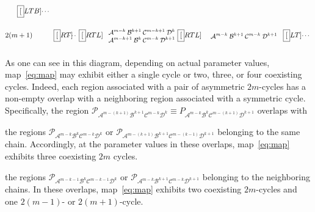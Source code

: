 \documentclass[10pt]{article}
\renewcommand{\P}{{\mathcal P}}
\newcommand{\A}{{\mathcal A}}
\newcommand{\B}{{\mathcal B}}
\newcommand{\C}{{\mathcal C}}
\newcommand{\D}{{\mathcal D}}
\begin{document}
\begin{equation*}
\begin{split}
{		}
		\hspace*{-1ex}
		\fbox[LTB]{
			\begin{minipage}[c][4.5em][c]{4ex}\small
				\dots
			\end{minipage}
		}\\[-1.5em]
		2(m+1)\hspace*{3em}
		&
		\fbox[RT]{
			\begin{minipage}[c][4.5em][c]{3ex}\small
				\hspace*{-.7em}\dots
			\end{minipage}
		}\hspace*{-1ex}
		\fbox[RTL]{
			\begin{minipage}[c][3.5em][c]{11em}\small\centering
				$\A^{m-k}\:\B^{k+1}\:\C^{m-k+1}    \:\D^{k}$\\
				$\A^{m-k+1}   \:\B^{k}  \:\C^{m-k}\:\D^{k+1}$
			\end{minipage}
		}\hspace*{-1ex}
		\fbox[RTL]{
			\begin{minipage}[c][4.5em][c]{12em}\small\centering
				$\A^{m-k}\:\B^{k+1}\:\C^{m-k}\:\D^{k+1}$
			\end{minipage}
		}
		\hspace*{-1ex}
		\fbox[LT]{
			\begin{minipage}[c][3.5em][c]{1ex}\small
				\dots
			\end{minipage}
		}
	\end{split}
\end{equation*}
As one can see in this diagram, depending on actual parameter values,
map~\eqref{eq:map} may exhibit either a single cycle or two, three, or
four coexisting cycles.  Indeed, each region associated with a pair of
asymmetric $2m$-cycles has a non-empty overlap with a neighboring
region associated with a symmetric cycle.  Specifically, the region
$\P_{\A^{m-(k+1)}\B^{k+1}\C^{m-k}\D^{k}} \equiv P_{\A^{m-k} \B^{k}
			\C^{m-(k+1)}\D^{k+1}}$ overlaps with
\begin{compactenum}[C1:]
	\item the regions $\P_{\A^{m-k}\B^{k}\C^{m-k}\D^{k}}$ or
	$\P_{\A^{m-(k+1)}\B^{k+1}\C^{m-(k-1)}\D^{k+1}}$ belonging to
	the same chain. Accordingly, at the parameter values in these overlaps,
	map~\eqref{eq:map} exhibits three coexisting $2m$ cycles.
	\item
	the regions $\P_{\A^{m-k-1}\B^{k}\C^{m-k-1}\D^{k}}$ or $\P_{\A^{m-k}\B^{k+1}\C^{m-k}\D^{k+1}}$ belonging to
	the neighboring chains. In these overlaps,
	map~\eqref{eq:map} exhibits two coexisting $2m$-cycles
	and one $2(m-1)$- or $2(m+1)$-cycle.
\end{compactenum}
\end{document}
